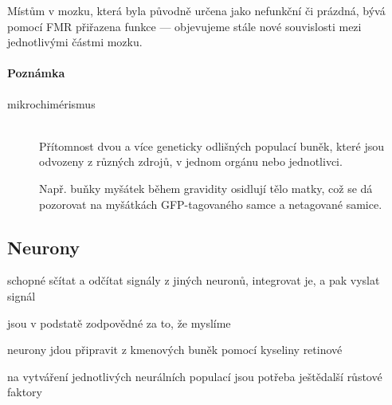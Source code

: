 \documentclass[DIV=8]{scrreprt}
\newcommand{\mybox}[2]{
    \paragraph{#1} #2
}
\begin{document}
Místům v mozku, která byla původně určena jako nefunkční či prázdná, bývá pomocí FMR přiřazena funkce --- objevujeme stále nové souvislosti mezi jednotlivými částmi mozku.

\mybox{Poznámka}{\begin{description}
\item[mikrochimérismus]\hfill \\
Přítomnost dvou a více geneticky odlišných populací buněk, které jsou odvozeny z různých zdrojů, v jednom orgánu nebo jednotlivci.

Např. buňky myšátek během gravidity osidlují tělo matky, což se dá pozorovat na myšátkách GFP-tagovaného samce a netagované samice.

\end{description}
}


\subsection{Neurony} \label{Neurony}


\begin{myItemize}[nosep]
    \item schopné sčítat a odčítat signály z jiných neuronů, integrovat je, a pak vyslat signál
    \item jsou v podstatě zodpovědné za to, že myslíme
    \item neurony jdou připravit z kmenových buněk pomocí kyseliny retinové
\begin{myItemize}[nosep]
    \item na vytváření jednotlivých neurálních populací jsou potřeba ještědalší růstové faktory
\end{myItemize}

\end{myItemize}
\end{document}
